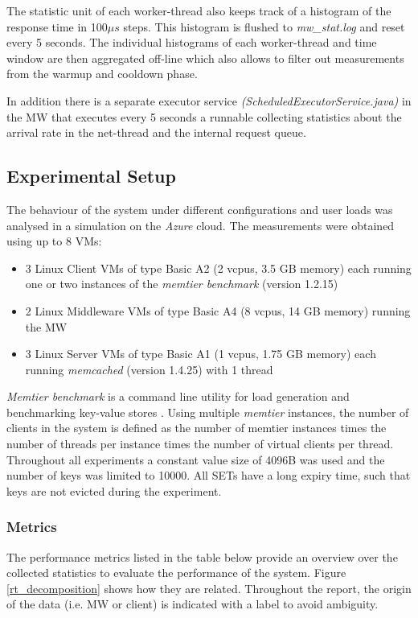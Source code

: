 \documentclass[report.tex]{subfiles}
\begin{document}
The statistic unit of each worker-thread also keeps track of a histogram of the response time in 100$\mu s$ steps. This histogram is flushed to \emph{mw\_stat.log} and reset every 5 seconds. The individual histograms of each worker-thread and time window are then aggregated off-line which also allows to filter out measurements from the warmup and cooldown phase.

In addition there is a separate executor service \emph{(ScheduledExecutorService.java)} in the MW that executes every 5 seconds a runnable collecting statistics about the arrival rate in the net-thread and the internal request queue. 

\subsection{Experimental Setup}

The behaviour of the system under different configurations and user loads was analysed in a simulation on the \emph{Azure} cloud.
The measurements were obtained using up to 8 VMs:
\begin{itemize}
	\vitemsep
	\item 3 Linux Client VMs of type Basic A2 (2 vcpus, 3.5 GB memory) each running one or two instances of the \emph{memtier benchmark} (version 1.2.15)
	\item 2 Linux Middleware VMs of type Basic A4 (8 vcpus, 14 GB memory) running the MW
	\item 3 Linux Server VMs of type Basic A1 (1 vcpus, 1.75 GB memory) each running \emph{memcached} (version 1.4.25) with 1 thread
\end{itemize}

\emph{Memtier benchmark} is a command line utility for load generation and benchmarking key-value stores \cite{memtier}.
Using multiple \emph{memtier} instances, the number of clients in the system is defined as the number of memtier instances times the number of threads per instance times the number of virtual clients per thread. Throughout all experiments a constant value size of 4096B was used and the number of keys was limited to 10000. All SETs have a long expiry time, such that keys are not evicted during the experiment.

\subsubsection{Metrics}\label{metrics}

The performance metrics listed in the table below provide an overview over the collected statistics to evaluate the performance of the system. Figure \ref{rt_decomposition} shows how they are related.
Throughout the report, the origin of the data (i.e. MW or client) is indicated with a label to avoid ambiguity.
\end{document}
